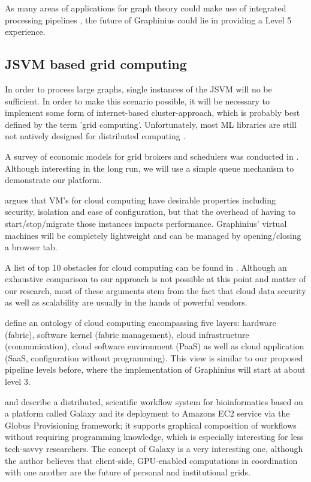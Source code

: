 As many areas of applications for graph theory could make use of integrated processing pipelines 
\citep{MLPipelines}, the future of Graphinius could lie in providing a Level 5 experience.


\subsection{JSVM based grid computing}
\label{ssect:jsvm_grid}

In order to process large graphs, single instances of the JSVM will no be sufficient. In order to make this scenario possible, it will be necessary to implement some form of internet-based cluster-approach, which is probably best defined by the term 'grid computing'. Unfortunately, most ML libraries are still not natively designed for distributed computing \citep{MLPipelineMLlib}.

A survey of economic models for grid brokers and schedulers was conducted in \citep{Abramson2002}. Although interesting in the long run, we will use a simple queue mechanism to demonstrate our platform.

\citep{Huang2006} argues that VM's for cloud computing have desirable properties including security, isolation and ease of configuration, but that the overhead of having to start/stop/migrate those instances impacts performance. Graphinius' virtual machines will be completely lightweight and can be managed by opening/closing a browser tab.

A list of top 10 obstacles for cloud computing can be found in \citep{Armbrust2010}. Although an exhaustive comparison to our approach is not possible at this point and matter of our research, most of these arguments stem from the fact that cloud data security as well as scalability are usually in the hands of powerful vendors.

\citep{Youseff2008} define an ontology of cloud computing encompassing five layers: hardware (fabric), software kernel (fabric management), cloud infrastructure (communication), cloud software environment (PaaS) as well as cloud application (SaaS, configuration without programming). This view is similar to our proposed pipeline levels before, where the implementation of Graphinius will start at about level 3.

\citep{Liu2012} and \citep{Liu2014} describe a distributed, scientific workflow system for bioinformatics based on a platform called Galaxy and its deployment to Amazons EC2 service via the Globus Provisioning framework; it supports graphical composition of workflows without requiring programming knowledge, which is especially interesting for less tech-savvy researchers. The concept of Galaxy is a very interesting one, although the author believes that client-side, GPU-enabled computations in coordination with one another are the future of personal and institutional grids.


